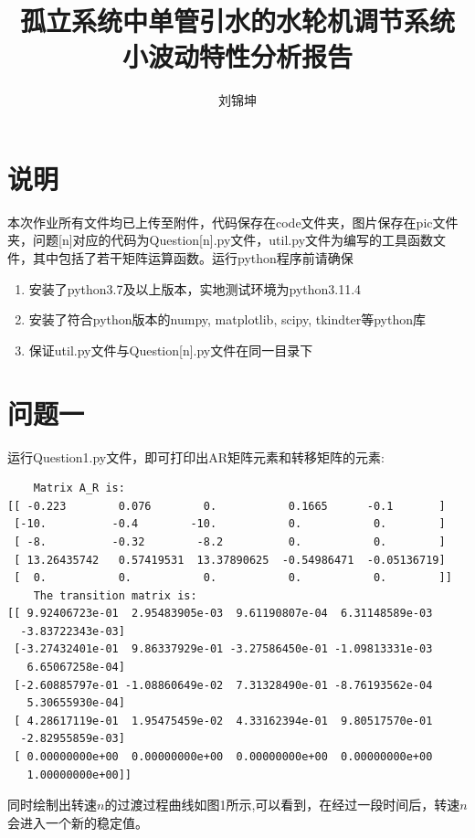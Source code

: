 \documentclass[UTF8]{ctexart}
\title{孤立系统中单管引水的水轮机调节系统\\小波动特性分析报告}
\author{刘锦坤}
\date{}
\begin{document}
\fancyfoot[C]{\thepage}

\maketitle
\tableofcontents

\section{说明}

本次作业所有文件均已上传至附件，代码保存在code文件夹，图片保存在pic文件夹，问题[n]对应的代码为Question[n].py文件，util.py文件为编写的工具函数文件，其中包括了若干矩阵运算函数。运行python程序前请确保

\begin{enumerate}
  \item 安装了python3.7及以上版本，实地测试环境为python3.11.4
  \item 安装了符合python版本的numpy, matplotlib, scipy, tkindter等python库
  \item 保证util.py文件与Question[n].py文件在同一目录下
\end{enumerate}

\section{问题一}

运行Question1.py文件，即可打印出AR矩阵元素和转移矩阵的元素:

\begin{verbatim}
    Matrix A_R is:
[[ -0.223        0.076        0.           0.1665      -0.1       ]
 [-10.          -0.4        -10.           0.           0.        ]
 [ -8.          -0.32        -8.2          0.           0.        ]
 [ 13.26435742   0.57419531  13.37890625  -0.54986471  -0.05136719]
 [  0.           0.           0.           0.           0.        ]]
    The transition matrix is:
[[ 9.92406723e-01  2.95483905e-03  9.61190807e-04  6.31148589e-03
  -3.83722343e-03]
 [-3.27432401e-01  9.86337929e-01 -3.27586450e-01 -1.09813331e-03
   6.65067258e-04]
 [-2.60885797e-01 -1.08860649e-02  7.31328490e-01 -8.76193562e-04
   5.30655930e-04]
 [ 4.28617119e-01  1.95475459e-02  4.33162394e-01  9.80517570e-01
  -2.82955859e-03]
 [ 0.00000000e+00  0.00000000e+00  0.00000000e+00  0.00000000e+00
   1.00000000e+00]]
\end{verbatim}

同时绘制出转速$n$的过渡过程曲线如图1所示,可以看到，在经过一段时间后，转速$n$会进入一个新的稳定值。
\end{document}
